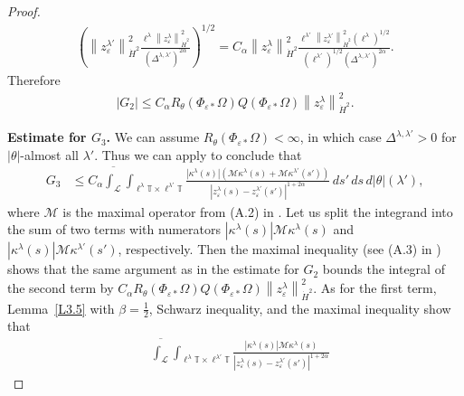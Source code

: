 \documentclass[reqno,centertags,12pt]{amsart}
\theoremstyle{definition}
\numberwithin{equation}{section}
\newcommand{\abs}[1]{\left\lvert#1\right\rvert}
\newcommand{\norm}[1]{\left\|#1\right\|}
\newcommand{\bbT}{{\mathbb{T}}}
\newcommand{\eps}{\varepsilon}
\newcommand{\tht}{\theta}
\begin{document}
\begin{proof}
\begin{align*}
        \left(
            \norm{z_{\eps}^{\lambda'}}_{\dot{H}^{2}}^{2}
            \frac{\ell^{\lambda}\norm{z_{\eps}^{\lambda}}_{\dot{H}^{2}}^{2}}
            {(\Delta^{\lambda,\lambda'})^{2\alpha}}
        \right)^{1/2}
        = C_{\alpha}\norm{z_{\eps}^{\lambda}}_{\dot{H}^{2}}^{2}
        \frac{\ell^{\lambda'}\norm{z_{\eps}^{\lambda'}}_{\dot{H}^{2}}^{2} 
        (\ell^{\lambda})^{1/2}}
        {(\ell^{\lambda'})^{1/2}(\Delta^{\lambda,\lambda'})^{2\alpha}}.
    \end{align*}
    Therefore
    \begin{align*}
        \abs{G_{2}} \leq C_{\alpha}R_{\tht}(\Phi_{\eps*}\Omega)
        Q(\Phi_{\eps*}\Omega)\norm{z_{\eps}^{\lambda}}_{\dot{H}^{2}}^{2}.
    \end{align*}

    \textbf{Estimate for $G_{3}$.} We can assume $R_{\tht}(\Phi_{\eps*}\Omega)<\infty$,
    in which case $\Delta^{\lambda,\lambda'} > 0$
    for $|\theta|$-almost all $\lambda'$.  Thus we can apply \cite[Lemma~A.4]{JeoZlaTouching}
    to conclude that
    \begin{align*}
        G_{3} &\leq C_{\alpha}\overline{\int_{\mathcal{L}}}
        \int_{\ell^{\lambda}\bbT\times \ell^{\lambda'}\bbT}
        \frac{\abs{\kappa^{\lambda}(s)}\left(
            \mathcal{M}\kappa^{\lambda}(s)
            + \mathcal{M}\kappa^{\lambda'}(s')
        \right)}
        {\abs{z_{\eps}^{\lambda}(s) - z_{\eps}^{\lambda'}(s')}^{1+2\alpha}}
        \,ds'\,ds\,d|\theta|(\lambda'),
    \end{align*}
    where $\mathcal{M}$ is the maximal operator from (A.2) in \cite{JeoZlaTouching}.
    Let us split the integrand into the sum of two terms with numerators
    $\abs{\kappa^{\lambda}(s)}\mathcal{M}\kappa^{\lambda}(s)$ and
    $\abs{\kappa^{\lambda}(s)}\mathcal{M}\kappa^{\lambda'}(s')$, respectively.  Then
     the maximal inequality (see (A.3) in \cite{JeoZlaTouching}) shows that  the same argument
    as in the estimate for $G_{2}$ bounds the integral of the second term by
    $C_{\alpha}R_{\tht}(\Phi_{\eps*}\Omega)Q(\Phi_{\eps*}\Omega)
    \norm{z_{\eps}^{\lambda}}_{\dot{H}^{2}}^{2}$.
    As for the first term, Lemma~\ref{L3.5} with $\beta=\frac 12$, Schwarz inequality, and
    the maximal inequality show that
    \begin{align*}
        &\overline{\int_{\mathcal{L}}}
        \int_{\ell^{\lambda}\bbT\times \ell^{\lambda'}\bbT}
        \frac{\abs{\kappa^{\lambda}(s)}\mathcal{M}\kappa^{\lambda}(s)}
        {\abs{z_{\eps}^{\lambda}(s) - z_{\eps}^{\lambda'}(s')}^{1+2\alpha}}

\end{align*}
\end{proof}
\end{document}
